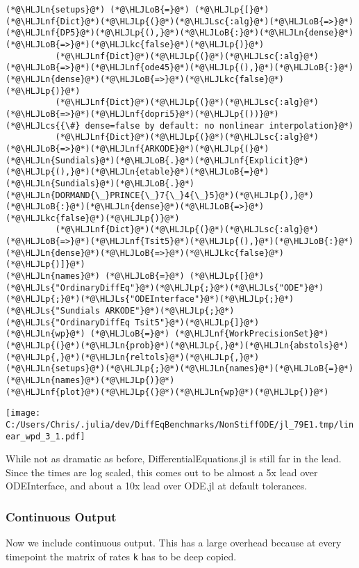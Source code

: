 \documentclass[12pt,a4paper]{article}
\newcommand{\HLJLkc}[1]{\textcolor[RGB]{59,151,46}{\textit{#1}}}
\newcommand{\HLJLn}[1]{#1}
\newcommand{\HLJLnf}[1]{\textcolor[RGB]{66,102,213}{#1}}
\newcommand{\HLJLs}[1]{\textcolor[RGB]{201,61,57}{#1}}
\newcommand{\HLJLsc}[1]{\textcolor[RGB]{201,61,57}{#1}}
\newcommand{\HLJLoB}[1]{\textcolor[RGB]{102,102,102}{\textbf{#1}}}
\newcommand{\HLJLp}[1]{#1}
\newcommand{\HLJLcs}[1]{\textcolor[RGB]{153,153,119}{\textit{#1}}}
\begin{document}
\begin{lstlisting}
(*@\HLJLn{setups}@*) (*@\HLJLoB{=}@*) (*@\HLJLp{[}@*)(*@\HLJLnf{Dict}@*)(*@\HLJLp{(}@*)(*@\HLJLsc{:alg}@*)(*@\HLJLoB{=>}@*)(*@\HLJLnf{DP5}@*)(*@\HLJLp{(),}@*)(*@\HLJLoB{:}@*)(*@\HLJLn{dense}@*)(*@\HLJLoB{=>}@*)(*@\HLJLkc{false}@*)(*@\HLJLp{)}@*)
          (*@\HLJLnf{Dict}@*)(*@\HLJLp{(}@*)(*@\HLJLsc{:alg}@*)(*@\HLJLoB{=>}@*)(*@\HLJLnf{ode45}@*)(*@\HLJLp{(),}@*)(*@\HLJLoB{:}@*)(*@\HLJLn{dense}@*)(*@\HLJLoB{=>}@*)(*@\HLJLkc{false}@*)(*@\HLJLp{)}@*)
          (*@\HLJLnf{Dict}@*)(*@\HLJLp{(}@*)(*@\HLJLsc{:alg}@*)(*@\HLJLoB{=>}@*)(*@\HLJLnf{dopri5}@*)(*@\HLJLp{())}@*) (*@\HLJLcs{{\#} dense=false by default: no nonlinear interpolation}@*)
          (*@\HLJLnf{Dict}@*)(*@\HLJLp{(}@*)(*@\HLJLsc{:alg}@*)(*@\HLJLoB{=>}@*)(*@\HLJLnf{ARKODE}@*)(*@\HLJLp{(}@*)(*@\HLJLn{Sundials}@*)(*@\HLJLoB{.}@*)(*@\HLJLnf{Explicit}@*)(*@\HLJLp{(),}@*)(*@\HLJLn{etable}@*)(*@\HLJLoB{=}@*)(*@\HLJLn{Sundials}@*)(*@\HLJLoB{.}@*)(*@\HLJLn{DORMAND{\_}PRINCE{\_}7{\_}4{\_}5}@*)(*@\HLJLp{),}@*)(*@\HLJLoB{:}@*)(*@\HLJLn{dense}@*)(*@\HLJLoB{=>}@*)(*@\HLJLkc{false}@*)(*@\HLJLp{)}@*)
          (*@\HLJLnf{Dict}@*)(*@\HLJLp{(}@*)(*@\HLJLsc{:alg}@*)(*@\HLJLoB{=>}@*)(*@\HLJLnf{Tsit5}@*)(*@\HLJLp{(),}@*)(*@\HLJLoB{:}@*)(*@\HLJLn{dense}@*)(*@\HLJLoB{=>}@*)(*@\HLJLkc{false}@*)(*@\HLJLp{)]}@*)
(*@\HLJLn{names}@*) (*@\HLJLoB{=}@*) (*@\HLJLp{[}@*)(*@\HLJLs{"OrdinaryDiffEq"}@*)(*@\HLJLp{;}@*)(*@\HLJLs{"ODE"}@*)(*@\HLJLp{;}@*)(*@\HLJLs{"ODEInterface"}@*)(*@\HLJLp{;}@*)(*@\HLJLs{"Sundials ARKODE"}@*)(*@\HLJLp{;}@*)(*@\HLJLs{"OrdinaryDiffEq Tsit5"}@*)(*@\HLJLp{]}@*)
(*@\HLJLn{wp}@*) (*@\HLJLoB{=}@*) (*@\HLJLnf{WorkPrecisionSet}@*)(*@\HLJLp{(}@*)(*@\HLJLn{prob}@*)(*@\HLJLp{,}@*)(*@\HLJLn{abstols}@*)(*@\HLJLp{,}@*)(*@\HLJLn{reltols}@*)(*@\HLJLp{,}@*)(*@\HLJLn{setups}@*)(*@\HLJLp{;}@*)(*@\HLJLn{names}@*)(*@\HLJLoB{=}@*)(*@\HLJLn{names}@*)(*@\HLJLp{)}@*)
(*@\HLJLnf{plot}@*)(*@\HLJLp{(}@*)(*@\HLJLn{wp}@*)(*@\HLJLp{)}@*)
\end{lstlisting}

\texttt{[image: C:/Users/Chris/.julia/dev/DiffEqBenchmarks/NonStiffODE/jl\_79E1.tmp/linear\_wpd\_3\_1.pdf]}

While not as dramatic as before, DifferentialEquations.jl is still far in the lead. Since the times are log scaled, this comes out to be almost a 5x lead over ODEInterface, and about a 10x lead over ODE.jl at default tolerances.

\subsubsection{Continuous Output}
Now we include continuous output. This has a large overhead because at every timepoint the matrix of rates \texttt{k} has to be deep copied.
\end{document}
